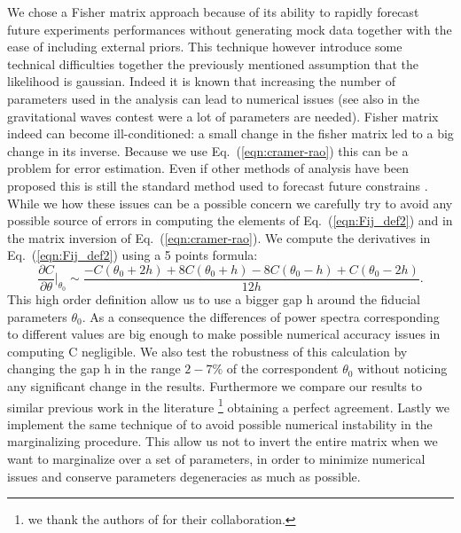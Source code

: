 \documentclass[aps,prd,preprint,groupedaddress]{revtex4-1}
\newcommand\refeq[1]{Eq.~(\ref{eqn:#1})}
\begin{document}
We chose a Fisher matrix approach because of its ability to rapidly forecast future experiments performances without generating mock data together with the ease of including external priors. 
This technique however introduce some technical difficulties together the previously mentioned assumption that the likelihood is gaussian. 
Indeed it is known \cite{2006astro.ph..9591A} that increasing the number of parameters used in the analysis can lead to numerical issues (see also \cite{2008PhRvD..77d2001V} in the gravitational waves contest were a lot of parameters are needed).
Fisher matrix indeed can become ill-conditioned: a small change in the fisher matrix led to a big change in its inverse. Because we use \refeq{cramer-rao} this can be a problem for error estimation. 
Even if other methods of analysis have been proposed \cite{2006JCAP...10..013P,2006astro.ph..9591A} this is still the standard method used to forecast future constrains \cite{wu:2014}.
While we how these issues can be a possible concern we carefully try to avoid any possible source of errors in computing the elements of \refeq{Fij_def2} and in the matrix inversion of \refeq{cramer-rao}.
We compute the derivatives in \refeq{Fij_def2} using a 5 points formula:
\begin{equation}
\frac{\partial C}{\partial \theta}\bigg|_{\theta_{0}} \sim \frac{-C(\theta_{0}+2h)+8C(\theta_{0}+h)-8C(\theta_{0}-h)+C(\theta_{0}-2h)}{12h}.
\label{eqn:deriv}
\end{equation}
This high order definition allow us to use a bigger gap h around the fiducial parameters $\theta_{0}$. As a consequence the differences of power spectra corresponding to different values are big enough to make possible numerical accuracy issues in computing C negligible.
We also test the robustness of this calculation by changing the gap h in the range $2-7\%$ of the correspondent $\theta_{0}$ without noticing any significant change in the results.
Furthermore we compare our results to similar previous work in the literature \footnote{we thank the authors of \cite{pan:2015} for their collaboration.} obtaining a perfect agreement.
Lastly we implement the same technique of \cite{2006astro.ph..9591A} to avoid possible numerical instability in the marginalizing procedure. This allow us not to invert the entire matrix when we want to marginalize over a set of parameters, in order to minimize numerical issues and conserve parameters degeneracies as much as possible.
\end{document}
